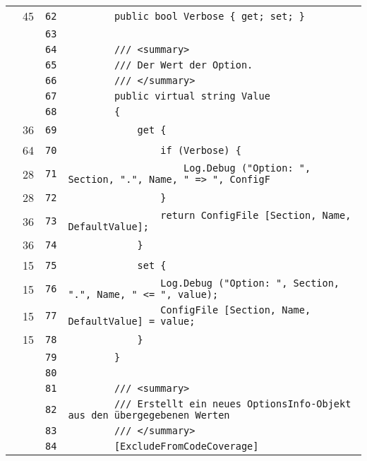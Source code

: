 \documentclass[a4paper,10pt]{article}
\begin{document}
\begin{longtable}[l]{lrrl}
\cellcolor{green} & 45 & \verb~62~ & \verb~        public bool Verbose { get; set; }~\\
\cellcolor{gray} &  & \verb~63~ & \verb~~\\
\cellcolor{gray} &  & \verb~64~ & \verb~        /// <summary>~\\
\cellcolor{gray} &  & \verb~65~ & \verb~        /// Der Wert der Option.~\\
\cellcolor{gray} &  & \verb~66~ & \verb~        /// </summary>~\\
\cellcolor{gray} &  & \verb~67~ & \verb~        public virtual string Value~\\
\cellcolor{gray} &  & \verb~68~ & \verb~        {~\\
\cellcolor{green} & 36 & \verb~69~ & \verb~            get {~\\
\cellcolor{green} & 64 & \verb~70~ & \verb~                if (Verbose) {~\\
\cellcolor{green} & 28 & \verb~71~ & \verb~                    Log.Debug ("Option: ", Section, ".", Name, " => ", ConfigF~\\
\cellcolor{green} & 28 & \verb~72~ & \verb~                }~\\
\cellcolor{green} & 36 & \verb~73~ & \verb~                return ConfigFile [Section, Name, DefaultValue];~\\
\cellcolor{green} & 36 & \verb~74~ & \verb~            }~\\
\cellcolor{green} & 15 & \verb~75~ & \verb~            set {~\\
\cellcolor{green} & 15 & \verb~76~ & \verb~                Log.Debug ("Option: ", Section, ".", Name, " <= ", value);~\\
\cellcolor{green} & 15 & \verb~77~ & \verb~                ConfigFile [Section, Name, DefaultValue] = value;~\\
\cellcolor{green} & 15 & \verb~78~ & \verb~            }~\\
\cellcolor{gray} &  & \verb~79~ & \verb~        }~\\
\cellcolor{gray} &  & \verb~80~ & \verb~~\\
\cellcolor{gray} &  & \verb~81~ & \verb~        /// <summary>~\\
\cellcolor{gray} &  & \verb~82~ & \verb~        /// Erstellt ein neues OptionsInfo-Objekt aus den übergegebenen Werten~\\
\cellcolor{gray} &  & \verb~83~ & \verb~        /// </summary>~\\
\cellcolor{gray} &  & \verb~84~ & \verb~        [ExcludeFromCodeCoverage]~\\

\end{longtable}
\end{document}
